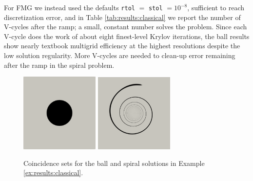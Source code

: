 \documentclass[review,hidelinks,onefignum,onetabnum,final]{siamart220329}  %
\begin{document}
\begin{example}
For FMG we instead used the defaults \texttt{rtol} $=$ \texttt{stol} $= 10^{-8}$, sufficient to reach discretization error, and in Table \ref{tab:results:classical} we report the number of V-cycles after the ramp; a small, constant number solves the problem.  Since each V-cycle does the work of about eight finest-level Krylov iterations, the ball results show nearly textbook multigrid efficiency at the highest resolutions despite the low solution regularity.  More V-cycles are needed to clean-up error remaining after the ramp in the spiral problem.
\end{example}

\begin{figure}[ht]
\centering
\includegraphics[width=0.35\textwidth]{ball-set.png} \qquad \includegraphics[width=0.35\textwidth]{spiral-set.png}
\caption{Coincidence sets for the ball and spiral solutions in Example \ref{ex:results:classical}.}
\label{fig:results:classical}
\end{figure}
\end{document}
